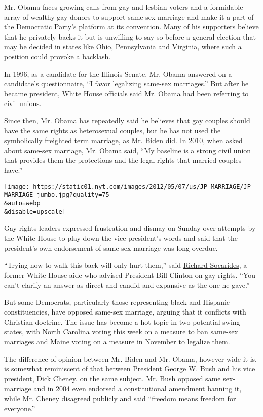 Mr. Obama faces growing calls from gay and lesbian voters and a
formidable array of wealthy gay donors to support same-sex marriage and
make it a part of the Democratic Party's platform at its convention.
Many of his supporters believe that he privately backs it but is
unwilling to say so before a general election that may be decided in
states like Ohio, Pennsylvania and Virginia, where such a position could
provoke a backlash.

In 1996, as a candidate for the Illinois Senate, Mr. Obama answered on a
candidate's questionnaire, ``I favor legalizing same-sex marriages.''
But after he became president, White House officials said Mr. Obama had
been referring to civil unions.

Since then, Mr. Obama has repeatedly said he believes that gay couples
should have the same rights as heterosexual couples, but he has not used
the symbolically freighted term marriage, as Mr. Biden did. In 2010,
when asked about same-sex marriage, Mr. Obama said, ``My baseline is a
strong civil union that provides them the protections and the legal
rights that married couples have.''

\texttt{[image: https://static01.nyt.com/images/2012/05/07/us/JP-MARRIAGE/JP-MARRIAGE-jumbo.jpg?quality=75\\\&auto=webp\\\&disable=upscale]}

Gay rights leaders expressed frustration and dismay on Sunday over
attempts by the White House to play down the vice president's words and
said that the president's own endorsement of same-sex marriage was long
overdue.

``Trying now to walk this back will only hurt them,'' said
\href{http://richardsocarides.com/}{Richard Socarides}, a former White
House aide who advised President Bill Clinton on gay rights. ``You can't
clarify an answer as direct and candid and expansive as the one he
gave.''

But some Democrats, particularly those representing black and Hispanic
constituencies, have opposed same-sex marriage, arguing that it
conflicts with Christian doctrine. The issue has become a hot topic in
two potential swing states, with North Carolina voting this week on a
measure to ban same-sex marriages and Maine voting on a measure in
November to legalize them.

The difference of opinion between Mr. Biden and Mr. Obama, however wide
it is, is somewhat reminiscent of that between President George W. Bush
and his vice president, Dick Cheney, on the same subject. Mr. Bush
opposed same sex-marriage and in 2004 even endorsed a constitutional
amendment banning it, while Mr. Cheney disagreed publicly and said
``freedom means freedom for everyone.''

